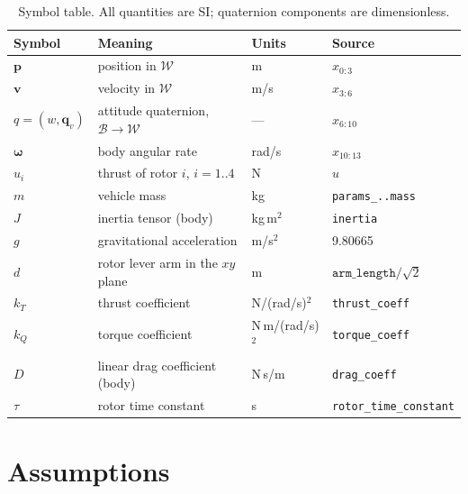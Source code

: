 \documentclass[11pt]{article}
\begin{document}
\begin{table}[h]
\centering
\caption{Symbol table. All quantities are SI; quaternion components are dimensionless.}
\label{tab:symbols}
\begin{tabular}{@{}llll@{}}
\toprule
Symbol & Meaning & Units & Source \\
\midrule
$\bm p$ & position in $\mathcal{W}$ & m & $x_{0:3}$ \\
$\bm v$ & velocity in $\mathcal{W}$ & m/s & $x_{3:6}$ \\
$q = (w,\bm q_v)$ & attitude quaternion, $\mathcal{B}\to\mathcal{W}$ & --- & $x_{6:10}$ \\
$\bm\omega$ & body angular rate & rad/s & $x_{10:13}$ \\
$u_i$ & thrust of rotor $i$, $i=1..4$ & N & $u$ \\
$m$ & vehicle mass & kg & \texttt{params\_..mass} \\
$J$ & inertia tensor (body) & kg\,m$^2$ & \texttt{inertia} \\
$g$ & gravitational acceleration & m/s$^2$ & 9.80665 \\
$d$ & rotor lever arm in the $xy$ plane & m & $\texttt{arm\_length}/\sqrt2$ \\
$k_T$ & thrust coefficient & N/(rad/s)$^2$ & \texttt{thrust\_coeff} \\
$k_Q$ & torque coefficient & N\,m/(rad/s)$^2$ & \texttt{torque\_coeff} \\
$D$ & linear drag coefficient (body) & N\,s/m & \texttt{drag\_coeff} \\
$\tau$ & rotor time constant & s & \texttt{rotor\_time\_constant} \\
\bottomrule
\end{tabular}
\end{table}

\section{Assumptions}
\label{sec:assumptions}
\end{document}

